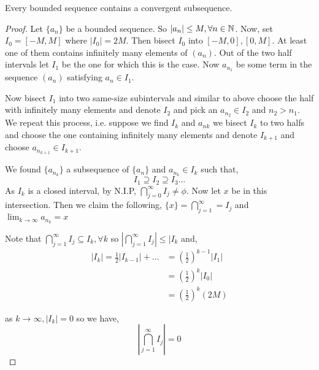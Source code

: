 \begin{theorem}
   Every bounded sequence contains a convergent subsequence.
\end{theorem}
\begin{proof}
    Let $\{a_n\} $ be a bounded sequence. So $|a_n| \le M, \forall n \in \mathbb{N}$. Now, set  $I_0 = [-M, M]$ where $|I_0| = 2M$. Then bisect  $I_0$ into $[-M, 0], [0, M]$. At least one of them contains infinitely many elements of  $(a_n)$. Out of the two half intervals let $I_1$ be the one for which this is the case. Now $a_{n_1} $ be some term in the sequence $(a_n)$ satisfying  $a_n \in I_1$.



    \vspace{1em}
    
    Now bisect $I_1$ into two same-size subintervals and similar to above choose the half with infinitely many elements and denote $I_2$ and pick an $a_{n_2} \in I_2$  and $n_2 > n_1$. We repeat this process, i.e. suppose we find $I_k$ and  $a_{nk}$ we bisect  $I_k$ to two halfs and choose the one containing infinitely many elements and denote  $I_{k + 1}$ and choose  $a_{n_{k+1}} \in I_{k + 1}$. 

    \vspace{1em}
    
    We found $\{a_n_k\} $ a subsequence of $\{a_n\} $ and $a_n_k \in I_k$ such that,  
    $$ I_1 \supseteq I_2 \supseteq I_3 \dots $$ 
    As $I_k$ is a closed interval, by N.I.P, $\bigcap_{j = 0}^{\infty} I_j \ne \phi$. Now let $x$ be in this intersection. Then we claim the following,  $\{x\} = \bigcap_{j = 1}^{\infty} = I_j $ and $\lim_{k \to \infty} a_n_k = x$

    \vspace{1em}
    Note that $\bigcap_{j = 1}^{\infty} I_j \subseteq I_k, \forall k$ so $|\bigcap_{j = 1}^{\infty} I_j| \le |I_k$ and, 
    \begin{align*}
        |I_k| = \frac{1}{2} |I_{k - 1}| + \dots &= (\frac{1}{2})^{k - 1} |I_1|\\
                                                &= (\frac{1}{2})^{k} |I_0|\\
                                                &= (\frac{1}{2})^{k} (2M)
    \end{align*}

    as $k \to \infty, |I_k| =0$ so we have,  
$$ | \bigcap_{j = 1}^{\infty} I_j| = 0$$ 


\vspace{1em}


\end{proof}
